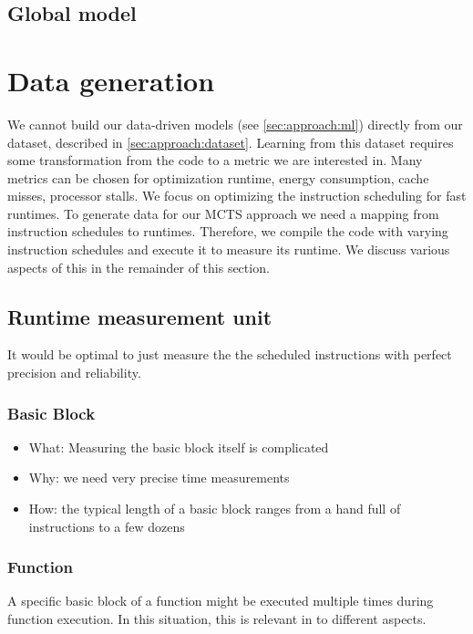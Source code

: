 \subsection{Global model}
\label{subsec:approach:ml:global}

\section{Data generation}
We cannot build our data-driven models (see \cref{sec:approach:ml}) directly from our dataset, described in \cref{sec:approach:dataset}.
Learning from this dataset requires some transformation from the code to a metric we are interested in.
Many metrics can be chosen for optimization \eg runtime, energy consumption, cache misses, processor stalls.
We focus on optimizing the instruction scheduling for fast runtimes.
To generate data for our MCTS approach we need a mapping from instruction schedules to runtimes.
Therefore, we compile the code with varying instruction schedules and execute it to measure its runtime.
We discuss various aspects of this in the remainder of this section.

\subsection{Runtime measurement unit}
It would be optimal to just measure the the scheduled instructions with perfect precision and reliability.
\subsubsection{Basic Block}
\begin{itemize}
    \item What: Measuring the basic block itself is complicated
    \item Why: we need very precise time measurements
    \item How: the typical length of a basic block ranges from a hand full of instructions to a few dozens
\end{itemize}
\subsubsection{Function}
\label{sec:approach:datageneration:runtime:function}
A specific basic block of a function might be executed multiple times during function execution.
In this situation, this is relevant in to different aspects.

